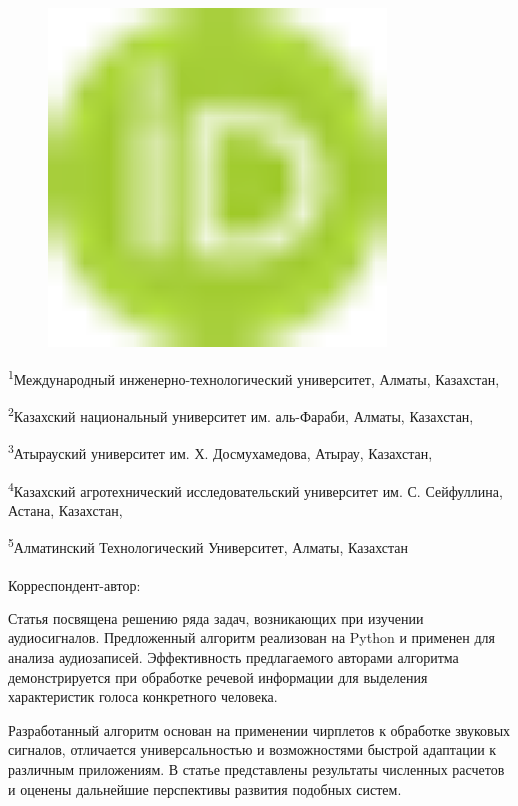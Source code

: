 \begin{figure}[H]
	\centering
	\includegraphics[width=0.8\textwidth]{media/ict/image16}
	\caption*{}
\end{figure}


\textsuperscript{1}Международный инженерно-технологический университет,
Алматы, Казахстан,

\textsuperscript{2}Казахский национальный университет им. аль-Фараби,
Алматы, Казахстан,

\textsuperscript{3}Атырауский университет им. Х. Досмухамедова, Атырау,
Казахстан,

\textsuperscript{4}Казахский агротехнический исследовательский
университет им. С. Сейфуллина, Астана, Казахстан,

\textsuperscript{5}Алматинский Технологический Университет, Алматы,
Казахстан

{\bfseries \textsuperscript{\envelope }}Корреспондент-автор:
\href{mailto:jomartova@mail.ru}{}

Статья посвящена решению ряда задач, возникающих при изучении
аудиосигналов. Предложенный алгоритм реализован на Python и применен для
анализа аудиозаписей. Эффективность предлагаемого авторами алгоритма
демонстрируется при обработке речевой информации для выделения
характеристик голоса конкретного человека.

Разработанный алгоритм основан на применении чирплетов к обработке
звуковых сигналов, отличается универсальностью и возможностями быстрой
адаптации к различным приложениям. В статье представлены результаты
численных расчетов и оценены дальнейшие перспективы развития подобных
систем.

